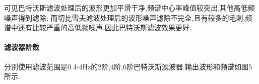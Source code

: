 \documentclass[12pt, a4paper, oneside]{ctexart}
\begin{document}
      可见巴特沃斯滤波处理后的波形更加平滑干净,频谱中心率峰值较突出,其他高低频噪声得到滤除;
      而切比雪夫滤波处理后的波形噪声滤除不完全,且有较多的毛刺,频谱中还有比较严重的高低频噪声.因此巴特沃斯滤波效果更好.

     

       \paragraph{滤波器阶数}
       分别使用滤波范围是0.4-4Hz的2阶,4阶,6阶巴特沃斯滤波器,输出波形和频谱如图5所示.

       \begin{figure}[H]
        \centering

\end{figure}
\end{document}

